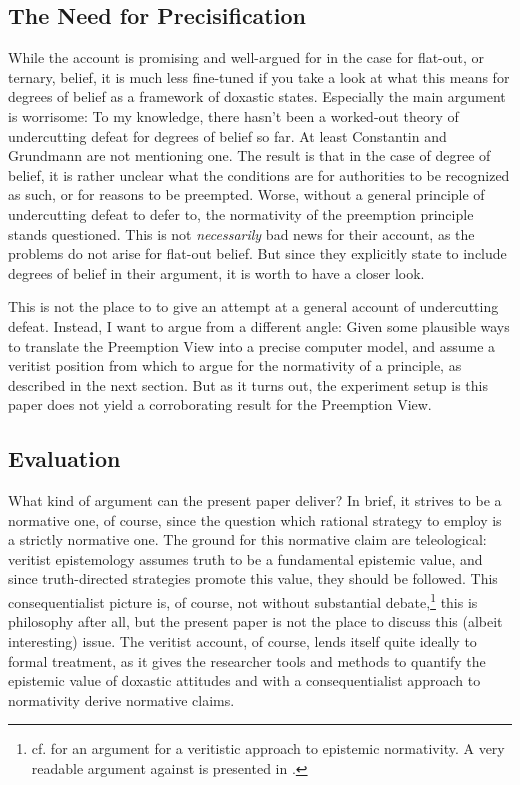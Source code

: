 \documentclass[11pt, a4paper]{scrartcl}
\renewcommand{\i}[1]{\emph{#1}}
\begin{document}
\subsection{The Need for Precisification}

While the account is promising and well-argued for in the case for flat-out, or ternary, belief, it is much less fine-tuned if you take a look at what this means for degrees of belief as a framework of doxastic states. Especially the main argument is worrisome: To my knowledge, there hasn't been a worked-out theory of undercutting defeat for degrees of belief so far. At least Constantin and Grundmann are not mentioning one. The result is that in the case of degree of belief, it is rather unclear what the conditions are for authorities to be recognized as such, or for reasons to be preempted. Worse, without a general principle of undercutting defeat to defer to, the normativity of the preemption principle stands questioned. This is not \i{necessarily} bad news for their account, as the problems do not arise for flat-out belief. But since they explicitly state to include degrees of belief in their argument, it is worth to have a closer look. 

This is not the place to to give an attempt at a general account of undercutting defeat. Instead, I want to argue from a different angle: Given some plausible ways to translate the Preemption View into a precise computer model, and assume a veritist position from which to argue for the normativity of a principle, as described in the next section. But as it turns out, the experiment setup is this paper does not yield a corroborating result for the Preemption View. 

\subsection{Evaluation}

What kind of argument can the present paper deliver? In brief, it strives to be a normative one, of course, since the question which rational strategy to employ is a strictly normative one. The ground for this normative claim are teleological: veritist epistemology assumes truth to be a fundamental epistemic value, and since truth-directed strategies promote this value, they should be followed. This consequentialist picture is, of course, not without substantial debate,\footnote{cf. \textcite{Goldman2001} for an argument for a veritistic approach to epistemic normativity. A very readable argument against is presented in \textcite{Berker2013}.} this is philosophy after all, but the present paper is not the place to discuss this (albeit interesting) issue. The veritist account, of course, lends itself quite ideally to formal treatment, as it gives the researcher tools and methods to quantify the epistemic value of doxastic attitudes and with a consequentialist approach to normativity derive normative claims. 
\end{document}
